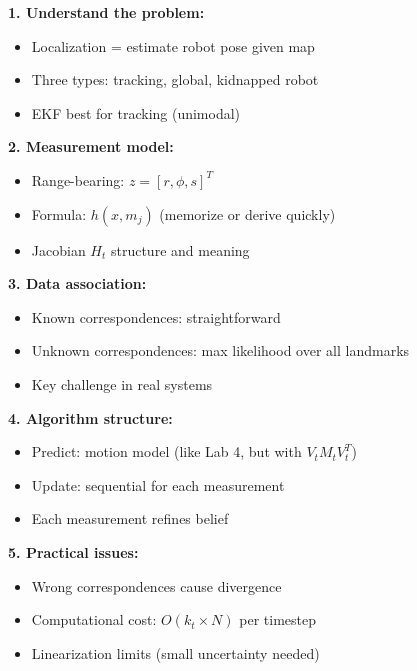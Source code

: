 \begin{tcolorbox}[colback=red!10!white,colframe=red!75!black,title=\textbf{Key Concepts for Exam}]

\textbf{1. Understand the problem:}
\begin{itemize}
    \item Localization = estimate robot pose given map
    \item Three types: tracking, global, kidnapped robot
    \item EKF best for tracking (unimodal)
\end{itemize}

\textbf{2. Measurement model:}
\begin{itemize}
    \item Range-bearing: $z = [r, \phi, s]^T$
    \item Formula: $h(x, m_j)$ (memorize or derive quickly)
    \item Jacobian $H_t$ structure and meaning
\end{itemize}

\textbf{3. Data association:}
\begin{itemize}
    \item Known correspondences: straightforward
    \item Unknown correspondences: max likelihood over all landmarks
    \item Key challenge in real systems
\end{itemize}

\textbf{4. Algorithm structure:}
\begin{itemize}
    \item Predict: motion model (like Lab 4, but with $V_t M_t V_t^T$)
    \item Update: sequential for each measurement
    \item Each measurement refines belief
\end{itemize}

\textbf{5. Practical issues:}
\begin{itemize}
    \item Wrong correspondences cause divergence
    \item Computational cost: $O(k_t \times N)$ per timestep
    \item Linearization limits (small uncertainty needed)
\end{itemize}

\end{tcolorbox}

